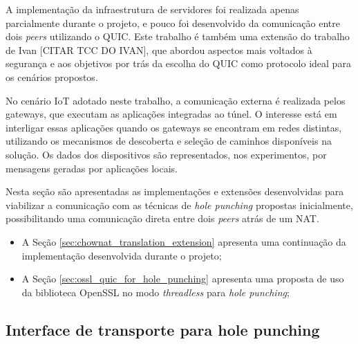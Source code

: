 A implementação da infraestrutura de servidores foi realizada apenas parcialmente durante o projeto, e pouco foi desenvolvido da comunicação entre dois \textit{peers} utilizando o QUIC. Este trabalho é também uma extensão do trabalho de Ivan [CITAR TCC DO IVAN], que abordou aspectos mais voltados à segurança e aos objetivos por trás da escolha do QUIC como protocolo ideal para os cenários propostos.

No cenário IoT adotado neste trabalho, a comunicação externa é realizada pelos gateways, que executam as aplicações integradas ao túnel. O interesse está em interligar essas aplicações quando os gateways se encontram em redes distintas, utilizando os mecanismos de descoberta e seleção de caminhos disponíveis na solução. Os dados dos dispositivos são representados, nos experimentos, por mensagens geradas por aplicações locais.

Nesta seção são apresentadas as implementações e extensões desenvolvidas para viabilizar a comunicação com as técnicas de \textit{hole punching} propostas inicialmente, possibilitando uma comunicação direta entre dois \textit{peers} atrás de um NAT. 

\begin{itemize}
    \item A Seção \ref{sec:chownat_translation_extension} apresenta uma continuação da implementação desenvolvida durante o projeto;
    \item A Seção \ref{sec:ossl_quic_for_hole_punching} apresenta uma proposta de uso da biblioteca OpenSSL no modo \textit{threadless} para \textit{hole punching}; 
\end{itemize}

\subsection{Interface de transporte para hole punching}
\label{sec:hole_punching_interface}

